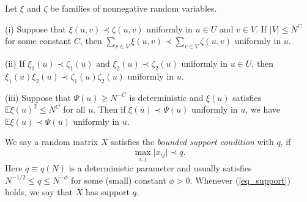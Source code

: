 \begin{lemma}\label{lem_stodomin}
Let $\xi$ and $\zeta$ be families of nonnegative random variables.

(i) Suppose that $\xi (u,v)\prec \zeta(u,v)$ uniformly in $u\in U$ and $v\in V$. If $|V|\le N^C$ for some constant $C$, then $\sum_{v\in V} \xi(u,v) \prec \sum_{v\in V} \zeta(u,v)$ uniformly in $u$.

(ii) If $\xi_1 (u)\prec \zeta_1(u)$ and $\xi_2 (u)\prec \zeta_2(u)$ uniformly in $u\in U$, then $\xi_1(u)\xi_2(u) \prec \zeta_1(u)\zeta_2(u)$ uniformly in $u$.

(iii) Suppose that $\Psi(u)\ge N^{-C}$ is deterministic and $\xi(u)$ satisfies $\mathbb E\xi(u)^2 \le N^C$ for all $u$. Then if $\xi(u)\prec \Psi(u)$ uniformly in $u$, we have $\mathbb E\xi(u) \prec \Psi(u)$ uniformly in $u$.
\end{lemma}


\begin{definition} \label{defn_support}
We say a random matrix $X$ satisfies the {\it{bounded support condition}} with $q$, if
\begin{equation}
\max_{i,j}\vert x_{ij}\vert \prec q. \label{eq_support}
\end{equation}
Here $q\equiv q(N)$ is a deterministic parameter and usually satisfies $ N^{-{1}/{2}} \leq q \leq N^{- \phi} $ for some (small) constant $\phi>0$. Whenever (\ref{eq_support}) holds, we say that $X$ has support $q$. 
\end{definition}


